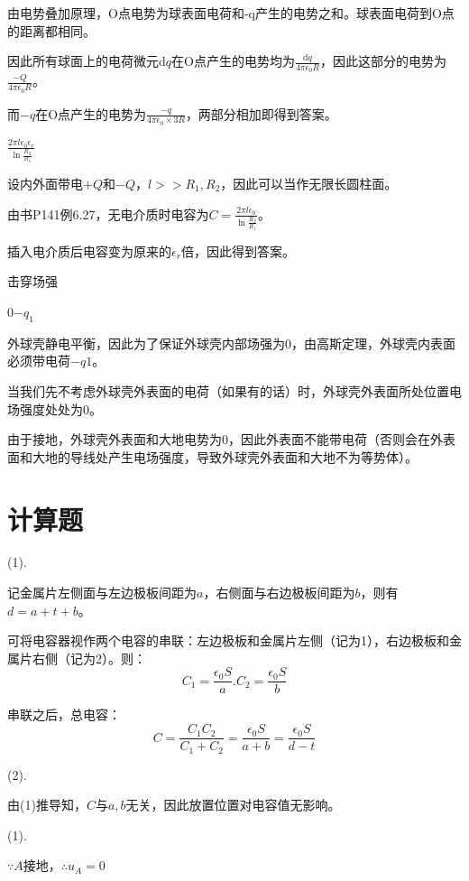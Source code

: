 \documentclass[b5paper,opensource,sourcefont,parskip]{qyxf-book}
\newcommand{\di}[1]{\mathrm{d}#1}
\begin{document}
由电势叠加原理，O点电势为球表面电荷和-q产生的电势之和。球表面电荷到O点的距离都相同。

因此所有球面上的电荷微元$\di{q}$在O点产生的电势均为$\frac{\di{q}}{4\pi\epsilon_0 R}$，因此这部分的电势为$\frac{-Q}{4\pi\epsilon_0 R}$。

而$ -q $在O点产生的电势为$\frac{-q}{4\pi\epsilon_0 \times 3R}$，两部分相加即得到答案。

 $\frac{2\pi l\epsilon_0\epsilon_r}{\ln \frac{R_2}{R_1}}$

\solve 设内外面带电$ +Q $和$ -Q $，$ l>>R_1,R_2 $，因此可以当作无限长圆柱面。

由书P141例6.27，无电介质时电容为$ C=\frac{2\pi l\epsilon_0}{\ln \frac{R_2}{R_1}} $。

插入电介质后电容变为原来的$ \epsilon_r $倍，因此得到答案。

 击穿场强

 $ 0 $\quad$ -q_1 $

\solve 外球壳静电平衡，因此为了保证外球壳内部场强为0，由高斯定理，外球壳内表面必须带电荷$ -q1 $。

当我们先不考虑外球壳外表面的电荷（如果有的话）时，外球壳外表面所处位置电场强度处处为0。

由于接地，外球壳外表面和大地电势为0，因此外表面不能带电荷（否则会在外表面和大地的导线处产生电场强度，导致外球壳外表面和大地不为等势体）。

\section{计算题}


\solve 

(1).

记金属片左侧面与左边极板间距为$ a $，右侧面与右边极板间距为$ b $，则有$ d=a+t+b $。

可将电容器视作两个电容的串联：左边极板和金属片左侧（记为1），右边极板和金属片右侧（记为2）。则：
\[C_1=\frac{\epsilon_0 S}{a}.C_2=\frac{\epsilon_0 S}{b}\]

串联之后，总电容：
\[C=\frac{C_1C_2}{C_1+C_2}=\frac{\epsilon_0 S}{a+b}=\frac{\epsilon_0 S}{d-t}\]

(2).

由(1)推导知，$ C $与$ a,b $无关，因此放置位置对电容值无影响。


\solve 
(1).

$ \because A$接地，$ \therefore u_A=0 $
\end{document}
